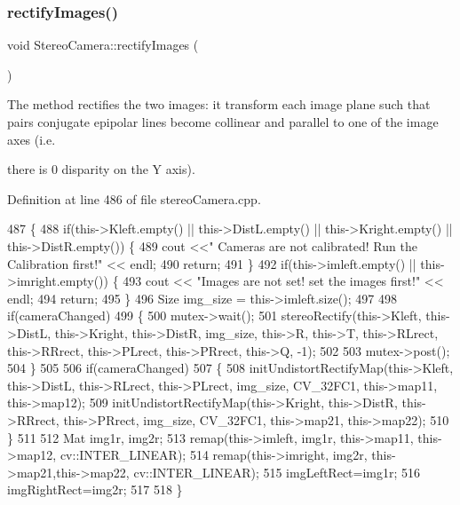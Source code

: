 \subsubsection{\texorpdfstring{rectify\+Images()}{rectifyImages()}}
{\footnotesize\ttfamily void Stereo\+Camera\+::rectify\+Images (\begin{DoxyParamCaption}{ }\end{DoxyParamCaption})}



The method rectifies the two images\+: it transform each image plane such that pairs conjugate epipolar lines become collinear and parallel to one of the image axes (i.\+e. 

there is 0 disparity on the Y axis). 

Definition at line 486 of file stereo\+Camera.\+cpp.


\begin{DoxyCode}
487 \{
488     \textcolor{keywordflow}{if}(this->Kleft.empty() || this->DistL.empty() || this->Kright.empty() || this->DistR.empty()) \{
489         cout <<\textcolor{stringliteral}{" Cameras are not calibrated! Run the Calibration first!"} << endl;
490         \textcolor{keywordflow}{return};
491     \}
492     \textcolor{keywordflow}{if}(this->imleft.empty() || this->imright.empty()) \{
493         cout << \textcolor{stringliteral}{"Images are not set! set the images first!"} << endl;
494         \textcolor{keywordflow}{return};
495     \}
496     Size img\_size = this->imleft.size();
497 
498     \textcolor{keywordflow}{if}(cameraChanged)
499     \{
500         mutex->wait();
501         stereoRectify(this->Kleft, this->DistL, this->Kright, this->DistR, img\_size, this->R, this->T, 
      this->RLrect, this->RRrect, this->PLrect, this->PRrect, this->Q, -1);
502 
503         mutex->post();
504     \}
505 
506     \textcolor{keywordflow}{if}(cameraChanged)
507     \{
508         initUndistortRectifyMap(this->Kleft, this->DistL, this->RLrect, this->PLrect, img\_size, CV\_32FC1, 
      this->map11, this->map12);
509         initUndistortRectifyMap(this->Kright,  this->DistR, this->RRrect, this->PRrect, img\_size, CV\_32FC1,
       this->map21, this->map22);
510     \}
511 
512     Mat img1r, img2r;
513     remap(this->imleft, img1r, this->map11, this->map12, cv::INTER\_LINEAR);
514     remap(this->imright, img2r, this->map21,this->map22, cv::INTER\_LINEAR);
515     imgLeftRect=img1r;
516     imgRightRect=img2r;
517 
518 \}
\end{DoxyCode}
\mbox{\label{classStereoCamera_a9f06cd4b170ad0ba45b681ee93d64851}} 
